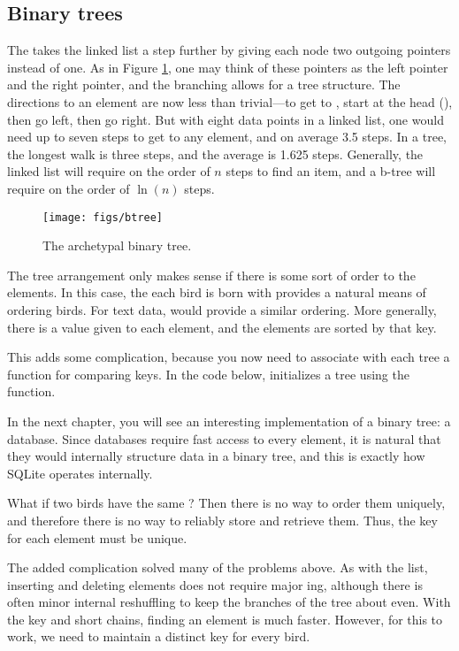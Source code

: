 \subsection{Binary trees} The  takes the linked list a step further
by giving each node two outgoing pointers instead of one. As in Figure
\ref{btreefig}, one may think of these pointers as the left pointer and
the right pointer, and the branching allows for a tree structure. The
directions to an element are now less than trivial---to get to
, start at the head (), then go left, then go right.
But with eight data points in a linked list, one would need up to seven
steps to get to any element, and on average 3.5 steps. In a tree, the
longest walk is three steps, and the average is 1.625 steps. Generally,
the linked list will require on the order of $n$ steps to find an item, and a b-tree
will require on the order of $\ln(n)$ steps.

\begin{figure}[htb]
\begin{center}
\texttt{[image: figs/btree]}
\end{center}
\caption{The archetypal binary tree.}
\label{btreefig}
\end{figure}

The tree arrangement only makes sense if there is some sort of order to
the elements. In this case, the  each bird is born with provides
a natural means of ordering birds. For text data,  would
provide a similar ordering. More generally, there is a  value given
to each element, and the elements are sorted by that key.

This adds some complication, because you now need to associate with each
tree a function for comparing keys. In the code below, 
initializes a tree using the  function.

In the next chapter, you will see an interesting implementation of a binary
tree: a database. Since databases require fast access to every element, 
it is natural that they would internally structure data in a binary
tree, and this is exactly how SQLite operates internally.

What if two birds have the same ? Then there is no way to order
them uniquely, and therefore there is no way to reliably store and
retrieve them. Thus, the key for each element must be unique.

The added complication solved many of the problems above. As with the
list, inserting and deleting elements does not require major
ing, although there is often minor internal reshuffling to
keep the branches of the tree about even.
With the key and short chains, finding an element is much faster.
However, for this to work, we need to maintain a distinct key for every
bird.


